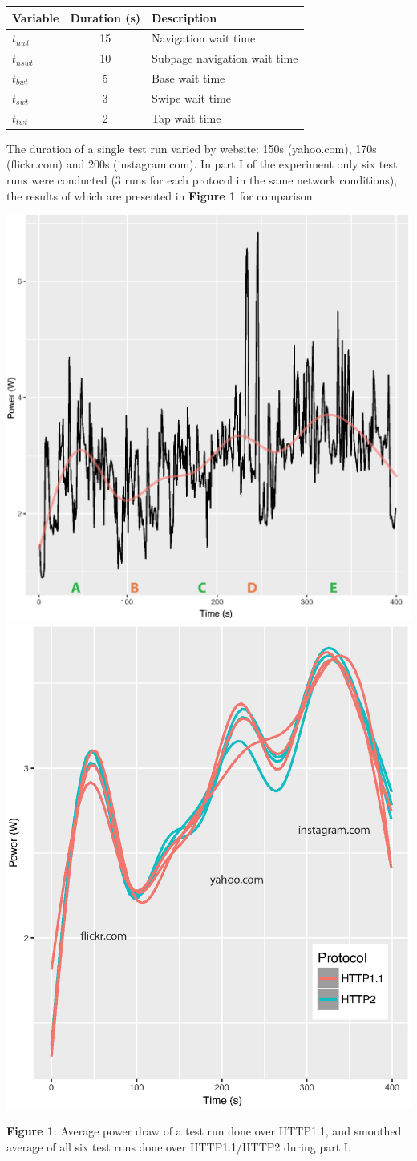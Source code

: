\documentclass[noback]{cuposter}
\begin{document}
\begin{center}
    \begin{tabular}{l|c|l}
        \textbf{Variable} & \textbf{Duration (s)} & \textbf{Description} \\
        \hline
        $t_{nwt}$   & 15    & Navigation wait time \\
        $t_{nswt}$  & 10    & Subpage navigation wait time \\
        $t_{bwt}$   & 5     & Base wait time \\
        $t_{swt}$   & 3     & Swipe wait time \\
        $t_{twt}$   & 2     & Tap wait time
    \end{tabular}
\end{center}
\vspace{2mm}
The duration of a single test run varied by website: 150s (yahoo.com), 170s (flickr.com) and 200s (instagram.com). In part I of the experiment only six test runs were conducted (3 runs for each protocol in the same network conditions), the results of which are presented in \textbf{Figure 1} for comparison.\\

\centerline{
    \includegraphics[width=0.5\linewidth]{figs/part_1_average_power}
    \includegraphics[width=0.5\linewidth]{figs/part_1_smoothed_power}
}
\begin{center}
    \textbf{Figure 1}: Average power draw of a test run done over HTTP1.1, and smoothed average of all six test runs done over HTTP1.1/HTTP2 during part I.
\end{center}
\vspace{-10mm}
\end{document}
